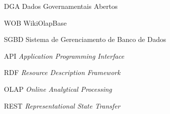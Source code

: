 
\begin{siglas}
    \item[DGA] Dados Governamentais Abertos
    \item[WOB] WikiOlapBase
    \item[SGBD] Sistema de Gerenciamento de Banco de Dados
    \item[API] \textit{Application Programming Interface}
    \item[RDF] \textit{Resource Description Framework}
    \item[OLAP] \textit{Online Analytical Processing}
    \item[REST] \textit{Representational State Transfer}
\end{siglas}


